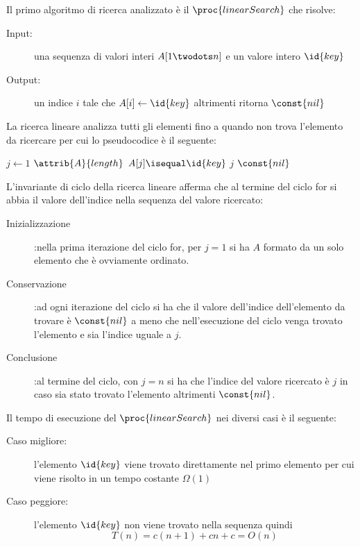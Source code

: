 Il primo algoritmo di ricerca analizzato è il $\proc{linearSearch}$ che risolve:\newline
\begin{description}
  \item[Input:] una sequenza di valori interi $A[1 \twodots n]$ e un valore intero $\id{key}$
  \item[Output:] un indice $i$ tale che $A[i] \gets \id{key}$ altrimenti ritorna $\const{nil}$
\end{description}
La ricerca lineare analizza tutti gli elementi fino a quando non trova l'elemento da
ricercare per cui lo pseudocodice è il seguente:
\begin{codebox}
\li \For $j \gets 1$ \To $\attrib{A}{length}$
    \Do
\li               \If $A[j] \isequal \id{key}$
                  \Then
\li                         \Return $j$
                  \End
    \End
\li \Return $\const{nil}$
\end{codebox}

L'invariante di ciclo della ricerca lineare afferma che al termine del ciclo for
si abbia il valore dell'indice nella sequenza del valore ricercato:
\begin{description}
  \item[Inizializzazione]:nella prima iterazione del ciclo for, per $j = 1$ si ha
        $A$ formato da un solo elemento che è ovviamente ordinato.
  \item[Conservazione]:ad ogni iterazione del ciclo si ha che il valore dell'indice
                       dell'elemento da trovare è $\const{nil}$ a meno che nell'esecuzione
                       del ciclo venga trovato l'elemento e sia l'indice uguale a $j$.
  \item[Conclusione]:al termine del ciclo, con $j = n$ si ha che l'indice del valore
                     ricercato è $j$ in caso sia stato trovato l'elemento altrimenti $\const{nil}$.
\end{description}

Il tempo di esecuzione del $\proc{linearSearch}$ nei diversi casi è il seguente:
\begin{description}
  \item[Caso migliore:] l'elemento $\id{key}$ viene trovato direttamente nel primo elemento
        per cui viene risolto in un tempo costante $\Omega(1)$
  \item[Caso peggiore:] l'elemento $\id{key}$ non viene trovato nella sequenza quindi
        \begin{equation*}
           T(n) = c(n+1) + cn + c = O(n)
        \end{equation*}
\end{description}
